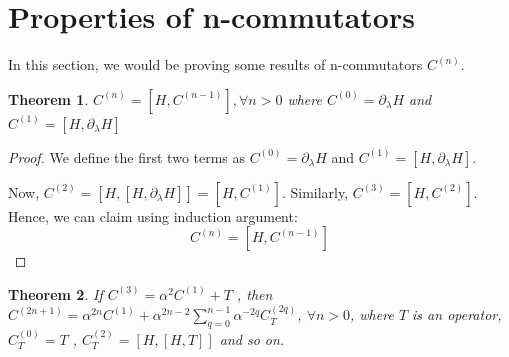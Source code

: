 \documentclass[11pt,a4paper]{article}
\newtheorem{thm}{Theorem}
\begin{document}
%
%
%
%

\section{Properties of n-commutators}\label{sec.Cn}
In this section, we would be proving some results of n-commutators $C^{(n)}$.

 
\begin{thm}
$C^{(n)}= [H, C^{(n-1)}],  \forall n>0$ where $C^{(0)}=  \partial_{\lambda}H$ and  $C^{(1)}= [H, \partial_{\lambda}H]$
\end{thm}
\begin{proof}
We define the first two terms  as $C^{(0)}=  \partial_{\lambda}H$ and $C^{(1)}= [H, \partial_{\lambda}H]$. 


Now, $C^{(2)}= [H,[H, \partial_{\lambda}H]]= [H, C^{(1)}]$. Similarly, $C^{(3)}=  [H, C^{(2)}]$. Hence, we can claim using induction argument:
\begin{equation}
C^{(n)}= [H, C^{(n-1)}]
\end{equation}
\end{proof}
 


\begin{thm}
If $C^{(3)}=  \alpha^2  C^{(1)} + T$ , then $C^{(2n+1)}= \alpha^{2n} C^{(1)} +\alpha^{2n-2} \sum_{q=0}^{n-1} \alpha^{-2q}C^{(2q)}_T $, $\forall n>0$,  where $T$ is an operator,  $ C^{(0)}_T=T$ , $C^{(2)}_T=[H, [H, T]]$ and so on.
\end{thm}
\end{document}
